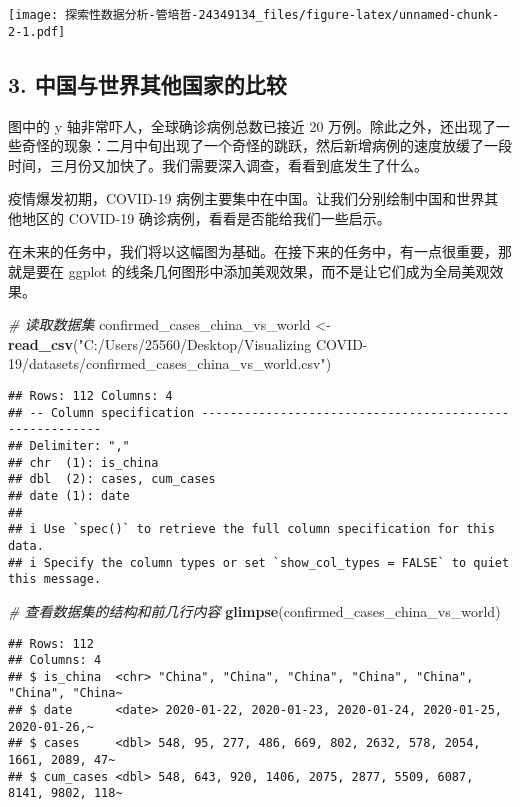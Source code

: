 \documentclass[
]{article}
\newenvironment{Shaded}{\begin{snugshade}}{\end{snugshade}}
\newcommand{\CommentTok}[1]{\textcolor[rgb]{0.56,0.35,0.01}{\textit{#1}}}
\newcommand{\FunctionTok}[1]{\textcolor[rgb]{0.13,0.29,0.53}{\textbf{#1}}}
\newcommand{\NormalTok}[1]{#1}
\newcommand{\OtherTok}[1]{\textcolor[rgb]{0.56,0.35,0.01}{#1}}
\newcommand{\StringTok}[1]{\textcolor[rgb]{0.31,0.60,0.02}{#1}}
\begin{document}
\texttt{[image: 探索性数据分析-管培哲-24349134\_files/figure-latex/unnamed-chunk-2-1.pdf]}

\subsection{3.
中国与世界其他国家的比较}\label{ux4e2dux56fdux4e0eux4e16ux754cux5176ux4ed6ux56fdux5bb6ux7684ux6bd4ux8f83}

图中的 y 轴非常吓人，全球确诊病例总数已接近 20
万例。除此之外，还出现了一些奇怪的现象：二月中旬出现了一个奇怪的跳跃，然后新增病例的速度放缓了一段时间，三月份又加快了。我们需要深入调查，看看到底发生了什么。

疫情爆发初期，COVID-19
病例主要集中在中国。让我们分别绘制中国和世界其他地区的 COVID-19
确诊病例，看看是否能给我们一些启示。

在未来的任务中，我们将以这幅图为基础。在接下来的任务中，有一点很重要，那就是要在
ggplot 的线条几何图形中添加美观效果，而不是让它们成为全局美观效果。

\begin{Shaded}
\begin{Highlighting}[]
\CommentTok{\# 读取数据集}
\NormalTok{confirmed\_cases\_china\_vs\_world }\OtherTok{\textless{}{-}} \FunctionTok{read\_csv}\NormalTok{(}\StringTok{"C:/Users/25560/Desktop/Visualizing COVID{-}19/datasets/confirmed\_cases\_china\_vs\_world.csv"}\NormalTok{)}
\end{Highlighting}
\end{Shaded}

\begin{verbatim}
## Rows: 112 Columns: 4
## -- Column specification --------------------------------------------------------
## Delimiter: ","
## chr  (1): is_china
## dbl  (2): cases, cum_cases
## date (1): date
## 
## i Use `spec()` to retrieve the full column specification for this data.
## i Specify the column types or set `show_col_types = FALSE` to quiet this message.
\end{verbatim}

\begin{Shaded}
\begin{Highlighting}[]
\CommentTok{\# 查看数据集的结构和前几行内容}
\FunctionTok{glimpse}\NormalTok{(confirmed\_cases\_china\_vs\_world)}
\end{Highlighting}
\end{Shaded}

\begin{verbatim}
## Rows: 112
## Columns: 4
## $ is_china  <chr> "China", "China", "China", "China", "China", "China", "China~
## $ date      <date> 2020-01-22, 2020-01-23, 2020-01-24, 2020-01-25, 2020-01-26,~
## $ cases     <dbl> 548, 95, 277, 486, 669, 802, 2632, 578, 2054, 1661, 2089, 47~
## $ cum_cases <dbl> 548, 643, 920, 1406, 2075, 2877, 5509, 6087, 8141, 9802, 118~
\end{verbatim}
\end{document}
